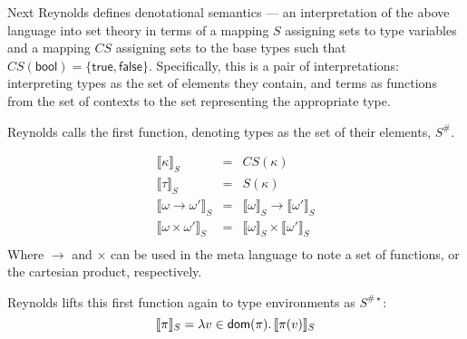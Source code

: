 \documentclass{article}
\begin{document}
Next Reynolds defines denotational semantics --- an interpretation of the above language into set
theory in terms of a mapping $S$ assigning sets to type variables and a mapping $CS$ assigning sets
to the base types such that $CS(\mathsf{bool})=\{\mathsf{true},\mathsf{false}\}$.  Specifically, this is a pair of
interpretations: interpreting types as the set of elements they contain, and terms as functions from
the set of contexts to the set representing the appropriate type.

Reynolds calls the first function, denoting types as the set of their elements, $S^\#$.

\newcommand{\denote}[2]{\ensuremath{\llbracket #1 \rrbracket_{#2}}}
\[
    \begin{array}{rcl}
        \denote{\kappa}{S} & = & CS(\kappa)\\
        \denote{\tau}{S} & = & S(\kappa)\\
        \denote{\omega\rightarrow\omega'}{S} & = & \denote{\omega}{S}\rightarrow\denote{\omega'}{S}\\
        \denote{\omega\times\omega'}{S} & = & \denote{\omega}{S}\times\denote{\omega'}{S}\\
    \end{array}
\]
Where $\rightarrow$ and $\times$ can be used in the meta language to note a set of functions, or the
cartesian product, respectively.

Reynolds lifts this first function again to type environments as $S^{\#\star}$:
\[
    \denote{\pi}{S} = \lambda {v\in\mathsf{dom}(\pi)}\ldotp\denote{\pi(v)}{S}
\]
\end{document}
